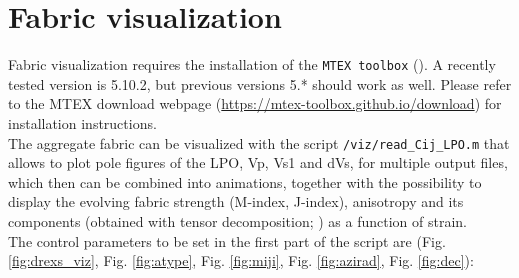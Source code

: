 \section{Fabric visualization}
Fabric visualization requires the installation of the \texttt{MTEX toolbox} (\citet{mainprice2011gsl}). A recently tested version is 5.10.2, but previous versions 5.* should work as well. Please refer to the MTEX download webpage (\url{https://mtex-toolbox.github.io/download}) for installation instructions. 
\\
The aggregate fabric can be visualized with the \matlabtitle{} script \texttt{/viz/read\_Cij\_LPO.m} that allows to plot pole figures of the LPO, Vp, Vs1 and dVs, for multiple output files, which then can be combined into animations, together with the possibility to display the evolving fabric strength (M-index, J-index), anisotropy and its components (obtained with tensor decomposition; \citet{browaeys2004gji}) as a function of strain.
\\
The control parameters to be set in the first part of the script are (Fig. \ref{fig:drexs_viz}, Fig. \ref{fig:atype}, Fig. \ref{fig:miji}, Fig. \ref{fig:azirad}, Fig. \ref{fig:dec}):
